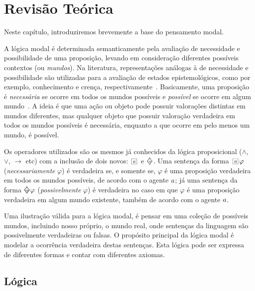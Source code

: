 \chapter{Revisão Teórica}
\label{cap:teo}

Neste capítulo, introduziremos brevemente a base do pensamento modal. 

A lógica modal é determinada semanticamente pela avaliação de necessidade e
possibilidade de uma proposição, levando em consideração diferentes possíveis
contextos (ou \emph{mundos}). Na literatura, representações análogas à de
necessidade e possibilidade são utilizadas para a avaliação de estados
epistemológicos, como por exemplo, conhecimento e crença,
respectivamente~\cite{belief}. Basicamente, uma proposição é \textit{necessária}
se ocorre em todos os mundos possíveis e \textit{possível} se ocorre em algum
mundo~\cite{chellas:modal_logic}.  A ideia é que uma ação ou objeto pode
possuir valorações distintas em mundos diferentes, mas qualquer objeto que
possuir valoração verdadeira em todos os mundos possíveis é necessária, enquanto
a que ocorre em pelo menos um mundo, é possível.

Os operadores utilizados são os mesmos já conhecidos da lógica proposicional
($\wedge$, $\vee$, $\rightarrow$ etc) com a inclusão de dois novos:
$\nec{\agent}$ e $\pos{\agent}$. Uma sentença da forma $\nec{\agent} \varphi$
(\textit{necessariamente} $\varphi$) é verdadeira se, e somente se, $\varphi$ é
uma proposição verdadeira em todos os mundos possíveis, de acordo com o agente
$a$; já uma sentença da forma $\pos{\agent} \varphi$
(\textit{possivelmente} $\varphi$) é verdadeira no caso em que $\varphi$ é uma
proposição verdadeira em algum mundo existente, também de acordo com o agente
$a$.

Uma ilustração válida para a lógica modal, é pensar em uma coleção de possíveis
mundos, incluindo nosso próprio, o mundo real, onde sentenças da linguagem são
possivelmente verdadeiras ou falsas. O propósito principal da lógica modal é
modelar a ocorrência verdadeira destas sentenças. Esta lógica pode ser expressa
de diferentes formas e contar com diferentes axiomas. %

\section{Lógica}
\label{sec:logicas}




